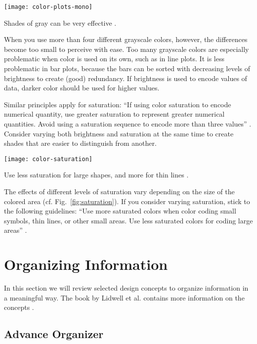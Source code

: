 \begin{marginfigure}
\centering
\texttt{[image: color-plots-mono]}
\caption{\label{fig:monographs} Shades of gray can be very effective \cite{Carter12}.}%
\end{marginfigure}

When you use more than four different grayscale colors, however, the differences become too small to perceive with ease. Too many grayscale colors are especially problematic when color is used on its own, such as in line plots. It is less problematic in bar plots, because the bars can be sorted with decreasing levels of brightness to create (good) redundancy. If brightness is used to encode values of data, darker color should be used for higher values.

Similar principles apply for saturation: ``If using color saturation to encode numerical quantity, use greater saturation to represent greater numerical quantities. Avoid using a saturation sequence to encode more than three values'' \cite{Ware12}. Consider varying both brightness and saturation at the same time to create shades that are easier to distinguish from another.

\begin{marginfigure}
\centering
\texttt{[image: color-saturation]}
\caption{\label{fig:saturation} Use less saturation for large shapes, and more for thin lines \cite{Ware12}.}%
\end{marginfigure}

The effects of different levels of saturation vary depending on the size of the colored area (cf. Fig.~\ref{fig:saturation}). If you consider varying saturation, stick to the following guidelines: ``Use more saturated colors when color coding small symbols, thin lines, or other small areas. Use less saturated colors for coding large areas'' \cite{Ware12}.


\section{Organizing Information}
\label{sec:organizinginfo}

In this section we will review selected design concepts to organize information in a meaningful way. The book by Lidwell et al. contains more information on the concepts \cite{Lidwell10}.

\subsection{Advance Organizer}

